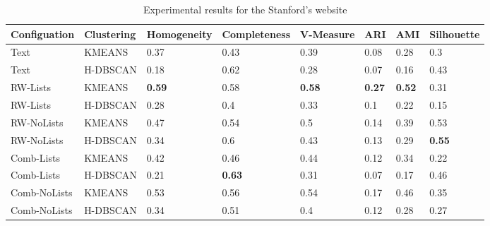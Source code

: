 \begin{landscape}
\begin{table}[h]
\centering
\caption{Experimental results for the Stanford's website}
\label{tab:stanford}
\begin{tabular}{|l|l|l|l|l|l|l|l|}
\hline
Configuation  & Clustering & Homogeneity & Completeness & V-Measure & ARI & AMI & Silhouette \\ \hline \hline
Text  & KMEANS & 0.37 & 0.43 & 0.39 & 0.08 & 0.28 & 0.3\\ \hline
Text  & H-DBSCAN & 0.18 & 0.62 & 0.28 & 0.07 & 0.16 & 0.43 \\ \hline
\hline
RW-Lists  & KMEANS & \textbf{0.59} & 0.58 & \textbf{0.58} & \textbf{0.27} & \textbf{0.52} & 0.31\\ \hline
RW-Lists & H-DBSCAN & 0.28 & 0.4 & 0.33 & 0.1 & 0.22 & 0.15\\ \hline
RW-NoLists & KMEANS & 0.47 & 0.54 & 0.5 & 0.14 & 0.39 & 0.53\\ \hline
RW-NoLists &  H-DBSCAN & 0.34 & 0.6 & 0.43 & 0.13 & 0.29 & \textbf{0.55}\\ \hline
\hline
Comb-Lists& KMEANS & 0.42 & 0.46 & 0.44 & 0.12 & 0.34 & 0.22\\ \hline
Comb-Lists&  H-DBSCAN & 0.21 & \textbf{0.63} & 0.31 & 0.07 & 0.17 & 0.46\\ \hline
Comb-NoLists  & KMEANS & 0.53 & 0.56 & 0.54 & 0.17 & 0.46 & 0.35\\ \hline
Comb-NoLists & H-DBSCAN & 0.34 & 0.51 & 0.4 & 0.12 & 0.28 & 0.27\\ \hline

\end{tabular}
\end{table}


\end{landscape}
